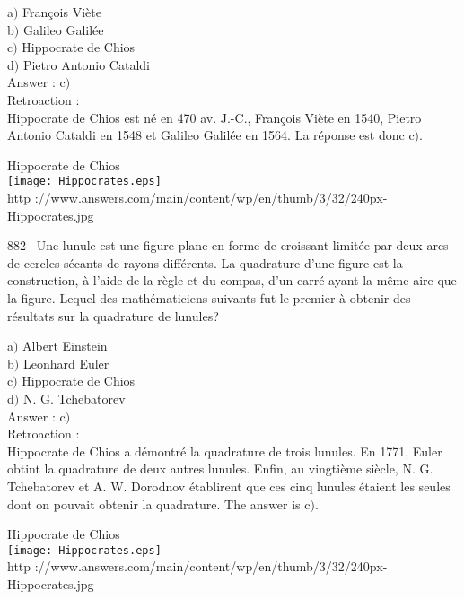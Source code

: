 ﻿\documentclass[letterpaper, 12pt]{article}
\begin{document}
a$)$ Fran\c cois Vi\`ete \\
b$)$ Galileo Galil\'ee \\
c$)$ Hippocrate de Chios \\
d$)$ Pietro Antonio Cataldi\\

Answer : c$)$\\

Retroaction : \\
Hippocrate de Chios est n\'e en 470 av. J.-C., Fran\c cois Vi\`ete
en 1540,
Pietro Antonio Cataldi en 1548 et Galileo Galil\'ee en 1564. La r\'eponse
est donc c$)$.\\

        \begin{center}
        Hippocrate de Chios\\
    \texttt{[image: Hippocrates.eps]}\\
        {\footnotesize http
://www.answers.com/main/content/wp/en/thumb/3/32/240px-Hippocrates.jpg}
    \end{center}

882-- Une lunule est une figure plane en forme de croissant
limit\'ee par deux arcs de cercles s\'ecants de rayons diff\'erents.
La quadrature d'une figure est la construction, \`a l'aide de la
r\`egle et du compas, d'un carr\'e ayant la m\^eme aire que la
figure. Lequel des math\'ematiciens suivants fut le premier \`a
obtenir des r\'esultats sur la quadrature de lunules?

a$)$ Albert Einstein \\
b$)$ Leonhard Euler \\
c$)$ Hippocrate de Chios \\
d$)$ N. G. Tchebatorev \\

Answer : c$)$\\

Retroaction : \\
Hippocrate de Chios a d\'emontr\'e la quadrature de trois lunules. En 1771,
Euler obtint la quadrature de deux autres lunules. Enfin, au vingti\`eme
si\`ecle, N. G. Tchebatorev et
A. W. Dorodnov \'etablirent que ces cinq lunules \'etaient les seules dont
on pouvait obtenir la quadrature. The answer is c$)$.\\

        \begin{center}
        Hippocrate de Chios\\
    \texttt{[image: Hippocrates.eps]}\\
        {\footnotesize http
://www.answers.com/main/content/wp/en/thumb/3/32/240px-Hippocrates.jpg}
    \end{center}
\end{document}
